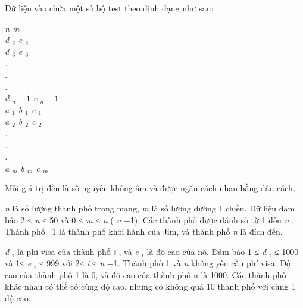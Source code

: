 Dữ liệu vào chứa một số bộ test theo định dạng như sau:     

\emph{       n m       
\\       d       $_        2       $       e       $_        2       $
\\       d       $_        3       $       e       $_        3       $
\\       .       
\\       .       
\\       .       
\\       d       $_        n-1       $       e       $_        n-1       $
\\       a       $_        1       $       b       $_        1       $       c       $_        1       $
\\       a       $_        2       $       b       $_        2       $       c       $_        2       $
\\       .       
\\       .       
\\       .       
\\       a       $_        m       $       b       $_        m       $       c       $_        m       $}

      Mỗi giá trị đều là số nguyên không âm và được ngăn cách nhau bằng dấu cách.     

\emph{       n      }      là số lượng thành phố trong mạng,      \emph{       m      }      là số lượng đường 1 chiều. Dữ liệu đảm bảo 2 ≤      \emph{       n      }      ≤ 50 và 0 ≤      \emph{       m      }      ≤      \emph{       n      }      (      \emph{       n      }      −1). Các thành phố được đánh số từ 1 đến      \emph{       n      }      . Thành phố  1 là thành phố khởi hành của Jim, và thành phố      \emph{       n      }      là đích đến.     

\emph{       d       $_        i       $}      là phí visa của thành phố      \emph{       i      }      , và      \emph{       e       $_        i       $}      là độ cao của nó. Đảm bảo 1 ≤      \emph{       d       $_        i       $}      ≤ 1000 và 1≤      \emph{       e       $_        i       $}      ≤ 999 với 2≤      \emph{       i      }      ≤      \emph{       n      }      −1. Thành phố 1 và      \emph{       n      }      không yêu cầu phí visa. Độ cao của thành phố 1 là 0, và độ cao của thành phố n là 1000. Các thành phố khác nhau có thể có cùng độ cao, nhưng có không quá 10 thành phố với cùng 1 độ cao.     

